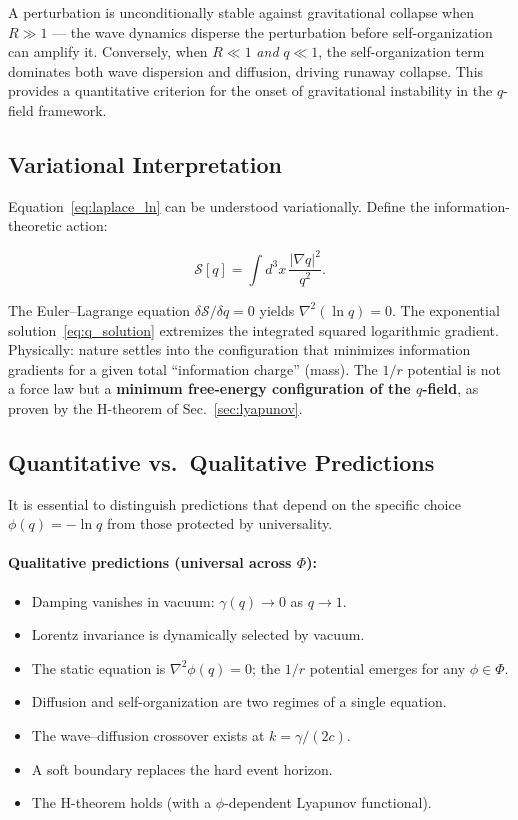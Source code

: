 \documentclass[aps,prd,twocolumn,showpacs,superscriptaddress,preprintnumbers]{revtex4-2}
\begin{document}
A perturbation is unconditionally stable against gravitational collapse when $R\gg1$ --- the wave dynamics disperse the perturbation before self-organization can amplify it.
Conversely, when $R\ll1$ \emph{and} $q\ll1$, the self-organization term dominates both wave dispersion and diffusion, driving runaway collapse.
This provides a quantitative criterion for the onset of gravitational instability in the $q$-field framework.

\subsection{Variational Interpretation}

Equation~\eqref{eq:laplace_ln} can be understood variationally.
Define the information-theoretic action:

\begin{equation}
\mathcal{S}[q] = \int d^3x \, \frac{|\nabla q|^2}{q^2}.
\label{eq:action}
\end{equation}

The Euler--Lagrange equation $\delta\mathcal{S}/\delta q=0$ yields $\nabla^2(\ln q)=0$.
The exponential solution~\eqref{eq:q_solution} extremizes the integrated squared logarithmic gradient.
Physically: nature settles into the configuration that minimizes information gradients for a given total ``information charge'' (mass).
The $1/r$ potential is not a force law but a \textbf{minimum free-energy configuration of the $q$-field}, as proven by the H-theorem of Sec.~\ref{sec:lyapunov}.

\subsection{Quantitative vs.\ Qualitative Predictions}
\label{sec:qual_vs_quant}

It is essential to distinguish predictions that depend on the specific choice $\phi(q)=-\ln q$ from those protected by universality.

\paragraph{Qualitative predictions (universal across $\Phi$):}
\begin{itemize}
    \item Damping vanishes in vacuum: $\gamma(q)\to0$ as $q\to1$.
    \item Lorentz invariance is dynamically selected by vacuum.
    \item The static equation is $\nabla^2\phi(q)=0$; the $1/r$ potential emerges for any $\phi\in\Phi$.
    \item Diffusion and self-organization are two regimes of a single equation.
    \item The wave--diffusion crossover exists at $k=\gamma/(2c)$.
    \item A soft boundary replaces the hard event horizon.
    \item The H-theorem holds (with a $\phi$-dependent Lyapunov functional).
\end{itemize}
\end{document}

